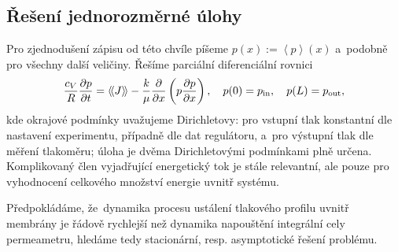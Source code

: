 \subsection{Řešení jednorozměrné úlohy}\label{ss:reseni_jednorozmerne_ulohy}
Pro zjednodušení zápisu od této chvíle píšeme $p(x):=\left\langle p \right\rangle\!(x)$ a~podobně pro všechny další veličiny. Řešíme parciální diferenciální rovnici
\begin{equation}\label{eq:general_1D_problem_pde}
    \frac{c_V}{R}\frac{\partial p}{\partial t}=\left\langle\!\left\langle J \right\rangle\!\right\rangle-\frac{k}{\mu}\frac{\partial }{\partial x}\left(p\frac{\partial p}{\partial x}\right),\quad p(0)=p_{\mathrm{in}},\quad p(L)=p_{\mathrm{out}},
\end{equation}
kde okrajové podmínky uvažujeme Dirichletovy: pro vstupní tlak konstantní dle nastavení experimentu, případně dle dat regulátoru, a~pro výstupní tlak dle měření tlakoměru; úloha je dvěma Dirichletovými podmínkami plně určena. Komplikovaný člen vyjadřující energetický tok je stále relevantní, ale pouze pro vyhodnocení celkového množství energie uvnitř systému. 

Předpokládáme, že~dynamika procesu ustálení tlakového profilu uvnitř membrány je řádově rychlejší než dynamika napouštění integrální cely permeametru, hledáme tedy stacionární, resp. asymptotické řešení problému. 



